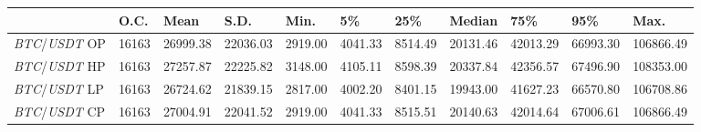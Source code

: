 \begin{tabular}{lllllllllll}
\toprule
 & \textbf{O.C.} & \textbf{Mean} & \textbf{S.D.} & \textbf{Min.} & \textbf{5\%} & \textbf{25\%} & \textbf{Median} & \textbf{75\%} & \textbf{95\%} & \textbf{Max.} \\
\midrule
\emph{BTC}/\emph{USDT} OP & 16163 & 26999.38 & 22036.03 & 2919.00 & 4041.33 & 8514.49 & 20131.46 & 42013.29 & 66993.30 & 106866.49 \\
\emph{BTC}/\emph{USDT} HP & 16163 & 27257.87 & 22225.82 & 3148.00 & 4105.11 & 8598.39 & 20337.84 & 42356.57 & 67496.90 & 108353.00 \\
\emph{BTC}/\emph{USDT} LP & 16163 & 26724.62 & 21839.15 & 2817.00 & 4002.20 & 8401.15 & 19943.00 & 41627.23 & 66570.80 & 106708.86 \\
\emph{BTC}/\emph{USDT} CP & 16163 & 27004.91 & 22041.52 & 2919.00 & 4041.33 & 8515.51 & 20140.63 & 42014.64 & 67006.61 & 106866.49 \\
\bottomrule
\end{tabular}
